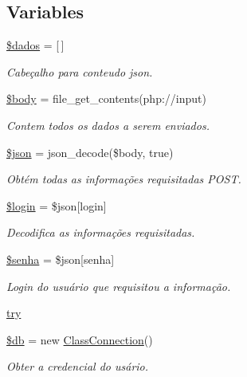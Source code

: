 \subsection*{Variables}
\begin{DoxyCompactItemize}
\item 
\hyperlink{nao_atendidos_proximo_8php_a252370d95039a38fa11afab784725d58}{\$dados} = \mbox{[}$\,$\mbox{]}
\begin{DoxyCompactList}\small\item\em Cabeçalho para conteudo json. \end{DoxyCompactList}\item 
\hyperlink{nao_atendidos_proximo_8php_a26b9f9373f7bb79dfcf8a86dff086b45}{\$body} = file\+\_\+get\+\_\+contents(\textquotesingle{}php\+://input\textquotesingle{})
\begin{DoxyCompactList}\small\item\em Contem todos os dados a serem enviados. \end{DoxyCompactList}\item 
\hyperlink{nao_atendidos_proximo_8php_acedd13b51401130848ce18f4d5c52605}{\$json} = json\+\_\+decode(\$body, true)
\begin{DoxyCompactList}\small\item\em Obtém todas as informações requisitadas P\+O\+ST. \end{DoxyCompactList}\item 
\hyperlink{nao_atendidos_proximo_8php_afc31993e855f9631572adfedcfe6f34b}{\$login} = \$json\mbox{[}\textquotesingle{}login\textquotesingle{}\mbox{]}
\begin{DoxyCompactList}\small\item\em Decodifica as informações requisitadas. \end{DoxyCompactList}\item 
\hyperlink{nao_atendidos_proximo_8php_a3678c8769c9698fd30581c1016c5f475}{\$senha} = \$json\mbox{[}\textquotesingle{}senha\textquotesingle{}\mbox{]}
\begin{DoxyCompactList}\small\item\em Login do usuário que requisitou a informação. \end{DoxyCompactList}\item 
\hyperlink{nao_atendidos_proximo_8php_abe4cc9788f52e49485473dc699537388}{try}
\item 
\hyperlink{nao_atendidos_proximo_8php_a1fa3127fc82f96b1436d871ef02be319}{\$db} = new \hyperlink{class_class_connection}{Class\+Connection}()
\begin{DoxyCompactList}\small\item\em Obter a credencial do usário. \end{DoxyCompactList}\item 

\end{DoxyCompactItemize}
